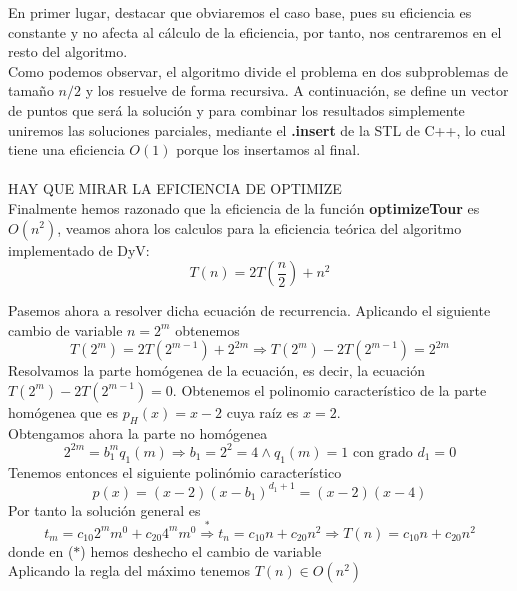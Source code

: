 \documentclass[11pt,openany]{book}
\begin{document}
En primer lugar, destacar que obviaremos el caso base, pues su eficiencia es constante y no afecta al cálculo de la eficiencia, por tanto, nos centraremos en el 
resto del algoritmo. \\
Como podemos observar, el algoritmo divide el problema en dos subproblemas de tamaño $n/2$ y los resuelve de forma recursiva. A continuación, se define un vector
de puntos que será la solución y para combinar los resultados simplemente uniremos las soluciones parciales, mediante el \textbf{.insert} de la STL de C++, lo cual
tiene una eficiencia $O(1)$ porque los insertamos al final.  \\ \\ 
HAY QUE MIRAR LA EFICIENCIA DE OPTIMIZE\\
Finalmente hemos razonado que la eficiencia de la función \textbf{optimizeTour} es $O(n^2)$, veamos ahora los calculos para la eficiencia teórica del algoritmo
implementado de DyV: 
\begin{equation*}
      T(n)=2T(\frac{n}{2})+n^2
\end{equation*}

Pasemos ahora a resolver dicha ecuación de recurrencia. Aplicando el siguiente cambio de variable $n=2^m$ obtenemos
\begin{equation*}
      T(2^m)=2T(2^{m-1})+2^{2m} \Longrightarrow T(2^m)-2T(2^{m-1})=2^{2m}
\end{equation*}
  Resolvamos la parte homógenea de la ecuación, es decir, la ecuación $T(2^m)-2T(2^{m-1})=0$. Obtenemos el polinomio
  característico de la parte homógenea que es $p_H(x)=x-2$ cuya raíz es $x=2$. \\
  Obtengamos ahora la parte no homógenea
\begin{equation*}
      2^{2m}=b_1^m q_1(m) \Longrightarrow b_1=2^2=4 \wedge q_1(m)=1 \text{ con grado } d_1=0
\end{equation*}
  Tenemos entonces el siguiente polinómio característico
\begin{equation*}
      p(x)=(x-2)(x-b_1)^{d_1+1}=(x-2)(x-4)
\end{equation*}
  Por tanto la solución general es
\begin{equation*}
      t_m=c_{10}2^mm^0+c_{20}4^mm^0\overset{*}{\Longrightarrow}  t_n=c_{10}n+c_{20}n^2 \Longrightarrow T(n)=c_{10}n+c_{20}n^2
\end{equation*}
  donde en ($*$) hemos deshecho el cambio de variable \\
  Aplicando la regla del máximo tenemos $T(n) \in O(n^2)$
\end{document}

